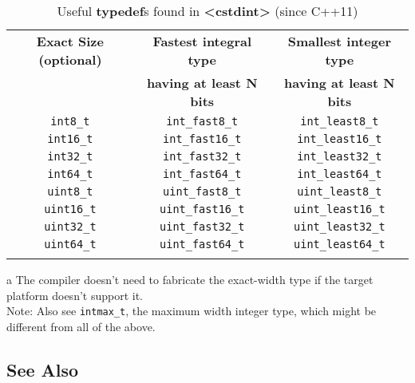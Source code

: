 \begin{table}[h!]
\begin{center}
\begin{threeparttable}
\caption{Useful {\ttfamily\bfseries typedef}s found in {\ttfamily\bfseries <cstdint>} (since
C++11)}\label{longlong-table1} \vspace{1.5ex}
{\small \begin{tabular}{c|c|c}\thickhline
\rowcolor[gray]{.9} {\sffamily\bfseries Exact Size (optional)\tnote{a}} & {\sffamily\bfseries Fastest integral type } & {\sffamily\bfseries Smallest integer type }\\
\rowcolor[gray]{.9}  & {\sffamily\bfseries having at least N bits} & {\sffamily\bfseries  having at least N bits}\\\hline
\lstinline!int8_t! & \lstinline!int_fast8_t! & \lstinline!int_least8_t!\\ \hline
\lstinline!int16_t! & \lstinline!int_fast16_t! & \lstinline!int_least16_t!\\ \hline
\lstinline!int32_t! & \lstinline!int_fast32_t! & \lstinline!int_least32_t!\\ \hline
\lstinline!int64_t! & \lstinline!int_fast64_t! & \lstinline!int_least64_t!\\ \thickhline
\lstinline!uint8_t! & \lstinline!uint_fast8_t! & \lstinline!uint_least8_t!\\ \hline
\lstinline!uint16_t!\tnote{a} & \lstinline!uint_fast16_t! & \lstinline!uint_least16_t!\\ \hline
\lstinline!uint32_t! & \lstinline!uint_fast32_t! & \lstinline!uint_least32_t!\\ \hline
\lstinline!uint64_t! & \lstinline!uint_fast64_t! & \lstinline!uint_least64_t!\\ \thickhline
\end{tabular} }
\begin{tablenotes}{\footnotesize
\item[a]{The compiler doesn't need to fabricate the exact-width type if the target platform doesn't support it.\\
Note: Also see \lstinline!intmax_t!, the maximum width integer type, which might be different from all of the above.}
}
\end{tablenotes}
\end{threeparttable}
    \end{center}
\end{table}

\subsection[See Also]{See Also}\label{see-also}

